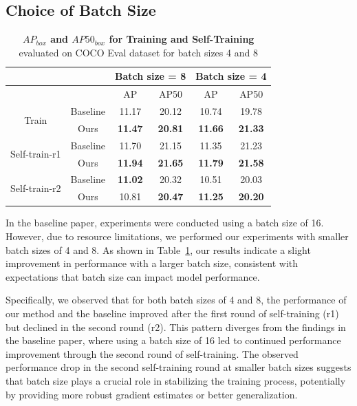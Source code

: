 \subsection{Choice of Batch Size}
\label{section:choice_of_batch_size}

\begin{table}[htbp]
	\centering
	\begin{tabular}{c|c|cc|cc}
		\toprule
		& & \multicolumn{2}{c|}{Batch size = 8} & \multicolumn{2}{c}{Batch size = 4} \\ \midrule
		& & AP & AP50 & AP & AP50 \\ \midrule
		\multirow{2}{*}{Train} & Baseline & 11.17 & 20.12 & 10.74 & 19.78 \\ 
		& Ours & \textbf{11.47} & \textbf{20.81} & \textbf{11.66} & \textbf{21.33} \\ \midrule
		\multirow{2}{*}{Self-train-r1} & Baseline & 11.70 & 21.15 & 11.35 & 21.23 \\ 
		& Ours & \textbf{11.94} & \textbf{21.65} & \textbf{11.79} & \textbf{21.58} \\ \midrule
		\multirow{2}{*}{Self-train-r2} & Baseline & \textbf{11.02} & 20.32 & 10.51 & 20.03 \\ 
		& Ours & 10.81 & \textbf{20.47} & \textbf{11.25} & \textbf{20.20 }\\ \bottomrule
	\end{tabular}
	\caption[\textbf{\(AP_{box}\) and \(AP50_{box}\) for Training and Self-Training for Different Batch Sizes}]{\textbf{\(AP_{box}\) and \(AP50_{box}\) for Training and Self-Training} evaluated on COCO Eval dataset  for batch sizes 4 and 8}
	\label{tab:batch_size_table}
\end{table}

In the baseline paper, experiments were conducted using a batch size of 16. However, due to resource limitations, we performed our experiments with smaller batch sizes of 4 and 8. As shown in Table~\ref{tab:batch_size_table}, our results indicate a slight improvement in performance with a larger batch size, consistent with expectations that batch size can impact model performance.

Specifically, we observed that for both batch sizes of 4 and 8, the performance of our method and the baseline improved after the first round of self-training (r1) but declined in the second round (r2). This pattern diverges from the findings in the baseline paper, where using a batch size of 16 led to continued performance improvement through the second round of self-training. The observed performance drop in the second self-training round at smaller batch sizes suggests that batch size plays a crucial role in stabilizing the training process, potentially by providing more robust gradient estimates or better generalization.

